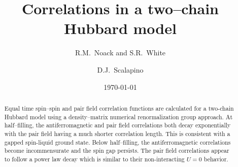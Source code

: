 
%
%
%
%
%


\draft

\title{
Correlations in a two--chain Hubbard model
}
\author{ R.M.\ Noack and S.R.\ White }
\address{
Department of Physics
University of California
Irvine, CA 92717
}
\author{ D.J.\ Scalapino }
\address{
Department of Physics
University of California
Santa Barbara, CA 93106
}
\date{\today}
\maketitle
\begin{abstract}
Equal time spin--spin and pair field correlation functions are
calculated for a two-chain Hubbard model using a density--matrix
numerical renormalization group approach.
At half--filling, the antiferromagnetic
and pair field correlations both decay
exponentially with the pair field having a much shorter correlation
length.
This is consistent with a gapped spin-liquid ground
state.
Below half--filling,  the antiferromagnetic correlations
become incommensurate and the spin gap persists.
The pair field
correlations appear to follow a power law decay which is similar to
their non-interacting $U=0$ behavior.
\end{abstract}

